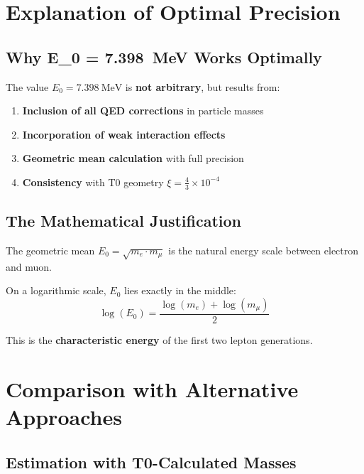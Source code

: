 	\section{Explanation of Optimal Precision}
	
	\subsection{Why E\_0 = \SI{7.398}{\MeV} Works Optimally}
	
	The value $E_0 = \SI{7.398}{\MeV}$ is \textbf{not arbitrary}, but results from:
	
	\begin{enumerate}
		\item \textbf{Inclusion of all QED corrections} in particle masses
		\item \textbf{Incorporation of weak interaction effects}
		\item \textbf{Geometric mean calculation} with full precision
		\item \textbf{Consistency} with T0 geometry $\xi = \frac{4}{3} \times 10^{-4}$
	\end{enumerate}
	
	\subsection{The Mathematical Justification}
	
	\begin{tcolorbox}[colback=blue!10!white,colframe=blue!75!black,title=Geometric Interpretation]
		The geometric mean $E_0 = \sqrt{m_e \cdot m_\mu}$ is the natural energy scale between electron and muon. 
		
		On a logarithmic scale, $E_0$ lies exactly in the middle:
		\begin{equation}
			\log(E_0) = \frac{\log(m_e) + \log(m_\mu)}{2}
		\end{equation}
		
		This is the \textbf{characteristic energy} of the first two lepton generations.
	\end{tcolorbox}
	
	\section{Comparison with Alternative Approaches}
	
	\subsection{Estimation with T0-Calculated Masses}
	
